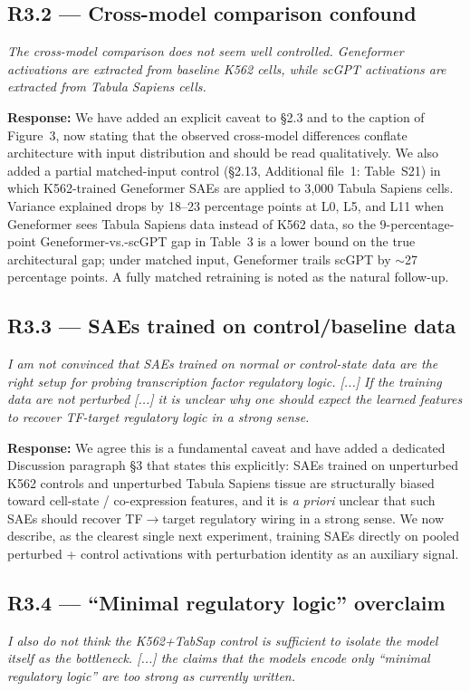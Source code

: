 \documentclass[11pt]{article}
\newcommand{\reviewercomment}[1]{\textit{\color{gray}#1}}
\newcommand{\response}[1]{\textbf{Response:} #1}
\begin{document}
\subsection*{R3.2 --- Cross-model comparison confound}
\reviewercomment{The cross-model comparison does not seem well controlled. Geneformer activations are extracted from baseline K562 cells, while scGPT activations are extracted from Tabula Sapiens cells.}

\response{We have added an explicit caveat to \S2.3 and to the caption of Figure~3, now stating that the observed cross-model differences conflate architecture with input distribution and should be read qualitatively. We also added a partial matched-input control (\S2.13, Additional file~1: Table~S21) in which K562-trained Geneformer SAEs are applied to 3{,}000 Tabula Sapiens cells. Variance explained drops by 18--23 percentage points at L0, L5, and L11 when Geneformer sees Tabula Sapiens data instead of K562 data, so the 9-percentage-point Geneformer-vs.-scGPT gap in Table~3 is a lower bound on the true architectural gap; under matched input, Geneformer trails scGPT by $\sim$27 percentage points. A fully matched retraining is noted as the natural follow-up.}

\subsection*{R3.3 --- SAEs trained on control/baseline data}
\reviewercomment{I am not convinced that SAEs trained on normal or control-state data are the right setup for probing transcription factor regulatory logic. [...] If the training data are not perturbed [...] it is unclear why one should expect the learned features to recover TF-target regulatory logic in a strong sense.}

\response{We agree this is a fundamental caveat and have added a dedicated Discussion paragraph \S3 that states this explicitly: SAEs trained on unperturbed K562 controls and unperturbed Tabula Sapiens tissue are structurally biased toward cell-state / co-expression features, and it is \emph{a priori} unclear that such SAEs should recover TF$\to$target regulatory wiring in a strong sense. We now describe, as the clearest single next experiment, training SAEs directly on pooled perturbed + control activations with perturbation identity as an auxiliary signal.}

\subsection*{R3.4 --- ``Minimal regulatory logic'' overclaim}
\reviewercomment{I also do not think the K562+TabSap control is sufficient to isolate the model itself as the bottleneck. [...] the claims that the models encode only ``minimal regulatory logic'' are too strong as currently written.}
\end{document}
